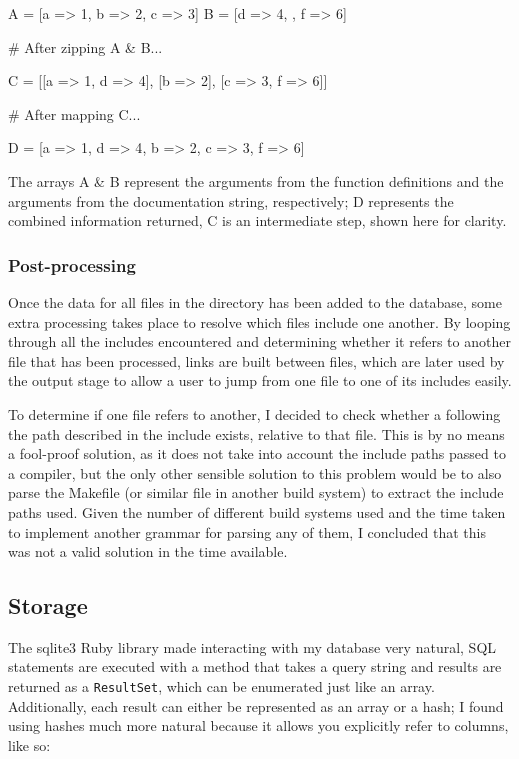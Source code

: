     \begin{code}[language=ruby, gobble=6]
      A = [{a => 1}, {b => 2}, {c => 3}]
      B = [{d => 4}, {}, {f => 6}]

      # After zipping A & B...

      C = [[{a => 1}, {d => 4}], [{b => 2}], [{c => 3}, {f => 6}]]

      # After mapping C...

      D = [{a => 1, d => 4}, {b => 2}, {c => 3, f => 6}]
    \end{code}

    The arrays A \& B represent the arguments from the function definitions
    and the arguments from the documentation string, respectively; D
    represents the combined information returned, C is an intermediate step,
    shown here for clarity.

      \subsubsection{Post-processing}
        Once the data for all files in the directory has been added to the
        database, some extra processing takes place to resolve which files
        include one another. By looping through all the includes encountered
        and determining whether it refers to another file that has been
        processed, links are built between files, which are later used by the
        output stage to allow a user to jump from one file to one of its
        includes easily.

        To determine if one file refers to another, I decided to check whether a
        following the path described in the include exists, relative to that
        file. This is by no means a fool-proof solution, as it does not take
        into account the include paths passed to a compiler, but the only other
        sensible solution to this problem would be to also parse the Makefile
        (or similar file in another build system) to extract the include paths
        used. Given the number of different build systems used and the time
        taken to implement another grammar for parsing any of them, I concluded
        that this was not a valid solution in the time available.

  \subsection{Storage}

    The sqlite3 Ruby library made interacting with my database very natural, SQL
    statements are executed with a method that takes a query string and results
    are returned as a \lstinline|ResultSet|, which can be enumerated just like
    an array. Additionally, each result can either be represented as an array or
    a hash; I found using hashes much more natural because it allows you
    explicitly refer to columns, like so:

